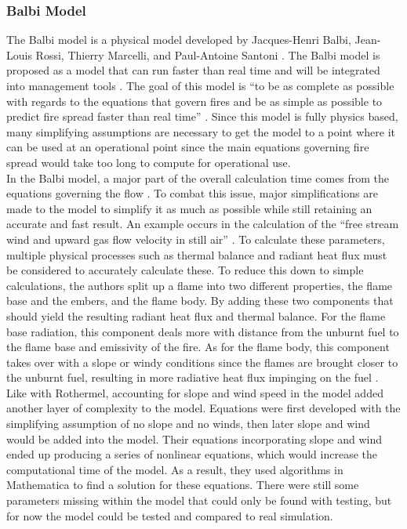 \documentclass{article}
\begin{document}
\subsubsection{Balbi Model}
\indent The Balbi model is a physical model developed by Jacques-Henri Balbi, Jean-Louis Rossi, Thierry Marcelli, and Paul-Antoine Santoni \citep{Balbi2007}. The Balbi model is proposed as a model that can run faster than real time and will be integrated into management tools \citep{Balbi2007}. The goal of this model is “to be as complete as possible with regards to the equations that govern fires and be as simple as possible to predict fire spread faster than real time” \citep{Balbi2007}. Since this model is fully physics based, many simplifying assumptions are necessary to get the model to a point where it can be used at an operational point since the main equations governing fire spread would take too long to compute for operational use. \\
\indent In the Balbi model, a major part of the overall calculation time comes from the equations governing the flow \citep{Balbi2007}. To combat this issue, major simplifications are made to the model to simplify it as much as possible while still retaining an accurate and fast result. An example occurs in the calculation of the “free stream wind and upward gas flow velocity in still air” \citep{Balbi2007}. To calculate these parameters, multiple physical processes such as thermal balance and radiant heat flux must be considered to accurately calculate these. To reduce this down to simple calculations, the authors split up a flame into two different properties, the flame base and the embers, and the flame body. By adding these two components that should yield the resulting radiant heat flux and thermal balance. For the flame base radiation, this component deals more with distance from the unburnt fuel to the flame base and emissivity of the fire. As for the flame body, this component takes over with a slope or windy conditions since the flames are brought closer to the unburnt fuel, resulting in more radiative heat flux impinging on the fuel \citep{Balbi2007}. \\
\indent Like with Rothermel, accounting for slope and wind speed in the model added another layer of complexity to the model. Equations were first developed with the simplifying assumption of no slope and no winds, then later slope and wind would be added into the model. Their equations incorporating slope and wind ended up producing a series of nonlinear equations, which would increase the computational time of the model. As a result, they used algorithms in Mathematica to find a solution for these equations. There were still some parameters missing within the model that could only be found with testing, but for now the model could be tested and compared to real simulation. \\
\end{document}
